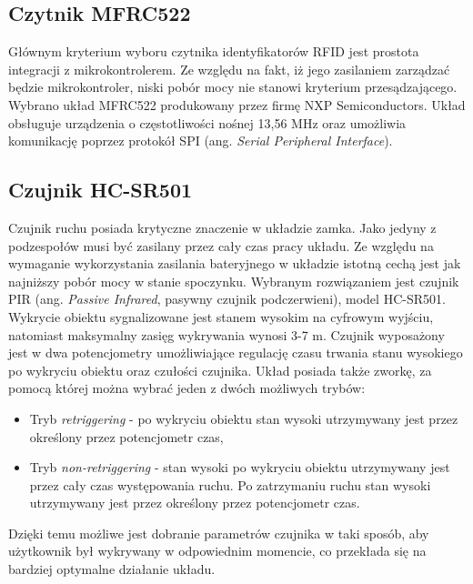         \subsection{Czytnik MFRC522}

            Głównym kryterium wyboru czytnika identyfikatorów RFID jest prostota integracji z mikrokontrolerem. Ze względu na fakt, iż jego zasilaniem zarządzać będzie mikrokontroler, niski pobór mocy nie stanowi kryterium przesądzającego. Wybrano układ MFRC522 produkowany przez firmę NXP Semiconductors. Układ obsługuje urządzenia o częstotliwości nośnej 13,56 MHz oraz umożliwia komunikację poprzez protokół SPI (ang. \textit{Serial Peripheral Interface}).

        \subsection{Czujnik HC-SR501}

            Czujnik ruchu posiada krytyczne znaczenie w układzie zamka. Jako jedyny z podzespołów musi być zasilany przez cały czas pracy układu. Ze względu na wymaganie wykorzystania zasilania bateryjnego w układzie istotną cechą jest jak najniższy pobór mocy w stanie spoczynku. Wybranym rozwiązaniem jest czujnik PIR (ang. \textit{Passive Infrared}, pasywny czujnik podczerwieni), model HC-SR501. Wykrycie obiektu sygnalizowane jest stanem wysokim na cyfrowym wyjściu, natomiast maksymalny zasięg wykrywania wynosi 3-7 m. Czujnik wyposażony jest w dwa potencjometry umożliwiające regulację czasu trwania stanu wysokiego po wykryciu obiektu oraz czułości czujnika. Układ posiada także zworkę, za pomocą której można wybrać jeden z dwóch możliwych trybów:

            \begin{itemize}
                \item Tryb \textit{retriggering} - po wykryciu obiektu stan wysoki utrzymywany jest przez określony przez potencjometr czas,
                \item Tryb \textit{non-retriggering} - stan wysoki po wykryciu obiektu utrzymywany jest przez cały czas występowania ruchu. Po zatrzymaniu ruchu stan wysoki utrzymywany jest przez określony przez potencjometr czas.
            \end{itemize}

            Dzięki temu możliwe jest dobranie parametrów czujnika w taki sposób, aby użytkownik był wykrywany w odpowiednim momencie, co przekłada się na bardziej optymalne działanie układu.

